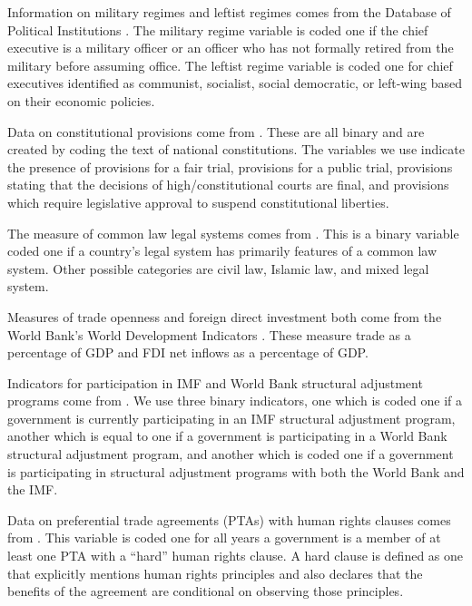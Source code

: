 \documentclass[12pt]{article}
\begin{document}
Information on military regimes and leftist regimes comes from the Database of Political Institutions \citep{beck2001new}. The military regime variable is coded one if the chief executive is a military officer or an officer who has not formally retired from the military before assuming office. The leftist regime variable is coded one for chief executives identified as communist, socialist, social democratic, or left-wing based on their economic policies. 

Data on constitutional provisions come from \citet{KeithTatePoe2009}. These are all binary and are created by 
coding the text of national constitutions. The variables we use indicate the presence of provisions for a fair trial, provisions for a public trial, provisions stating that the decisions of high/constitutional courts are final, and provisions which require legislative approval to suspend constitutional liberties. 

The measure of common law legal systems comes from \citet{powell2007international}. This is a binary variable coded one if a country's legal system has primarily features of a common law system. Other possible categories are civil law, Islamic law, and mixed legal system.

Measures of trade openness and foreign direct investment both come from the World Bank's World Development Indicators \citep{WorldBank2012}. These measure trade as a percentage of GDP and FDI net inflows as a percentage of GDP. 

Indicators for participation in IMF and World Bank structural adjustment programs come from \citet{AbouharbCingranelli2007}. We use three binary indicators, one which is coded one if a government is currently participating in an IMF structural adjustment program, another which is equal to one if a government is participating in a World Bank structural adjustment program, and another which is coded one if a government is participating in structural adjustment programs with both the World Bank and the IMF.

Data on preferential trade agreements (PTAs) with human rights clauses comes from \citet{SpilkerBohmelt2012}. This variable is coded one for all years a government is a member of at least one PTA with a ``hard'' human rights clause. A hard clause is defined as one that explicitly mentions human rights principles and also declares that the benefits of the agreement are conditional on observing those principles. 
\end{document}
